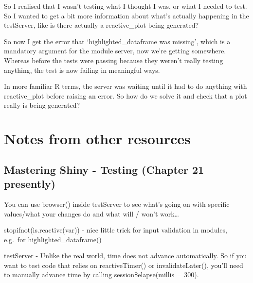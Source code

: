 \documentclass[
  letterpaper,
  DIV=11,
  numbers=noendperiod]{scrreprt}
\newenvironment{Shaded}{\begin{snugshade}}{\end{snugshade}}
\newcommand{\AttributeTok}[1]{\textcolor[rgb]{0.40,0.45,0.13}{#1}}
\newcommand{\FunctionTok}[1]{\textcolor[rgb]{0.28,0.35,0.67}{#1}}
\newcommand{\NormalTok}[1]{\textcolor[rgb]{0.00,0.23,0.31}{#1}}
\newcommand{\OtherTok}[1]{\textcolor[rgb]{0.00,0.23,0.31}{#1}}
\newcommand{\SpecialCharTok}[1]{\textcolor[rgb]{0.37,0.37,0.37}{#1}}
\begin{document}
So I realised that I wasn't testing what I thought I was, or what I
needed to test. So I wanted to get a bit more information about what's
actually happening in the testServer, like is there actually a
reactive\_plot being generated?

\begin{Shaded}
\end{Shaded}

So now I get the error that `highlighted\_dataframe was missing', which
is a mandatory argument for the module server, now we're getting
somewhere. Whereas before the tests were passing because they weren't
really testing anything, the test is now failing in meaningful ways.

In more familiar R terms, the server was waiting until it had to do
anything with reactive\_plot before raising an error. So how do we solve
it and check that a plot really is being generated?

\chapter{Notes from other resources}\label{notes-from-other-resources}

\section{Mastering Shiny - Testing (Chapter 21
presently)}\label{mastering-shiny---testing-chapter-21-presently}

You can use browser() inside testServer to see what's going on with
specific values/what your changes do and what will / won't work\ldots{}

stopifnot(is.reactive(var)) - nice little trick for input validation in
modules, e.g.~for highlighted\_dataframe()

testServer - Unlike the real world, time does not advance automatically.
So if you want to test code that relies on reactiveTimer() or
invalidateLater(), you'll need to manually advance time by calling
session\$elapse(millis = 300).
\end{document}
